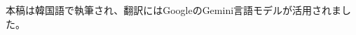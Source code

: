 \documentclass[twocolumn]{article}
\begin{document}
\section*{}
\vfill
	

\noindent
本稿は韓国語で執筆され、翻訳にはGoogleのGemini言語モデルが活用されました。
%	
%	
	
\end{document}
